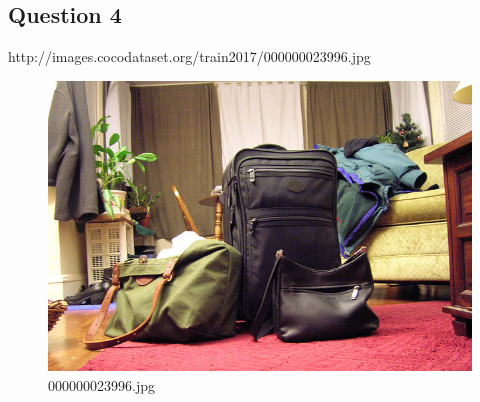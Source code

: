 \subsection*{Question 4}
http://images.cocodataset.org/train2017/000000023996.jpg
    \begin{figure}[h]
        \centering
        \includegraphics[width=0.8\linewidth]{../image set/easy/000000023996.jpg}
        \caption{000000023996.jpg}
    \end{figure}
